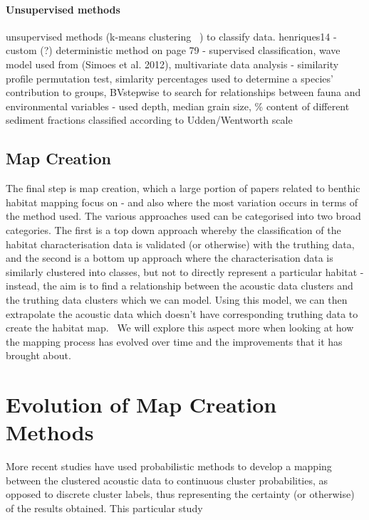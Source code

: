 \documentclass[12pt]{article}
\begin{document}
\begin{multicols}{2}
            \paragraph{Unsupervised methods}
            unsupervised methods (k-means clustering ~\citep{henriques14}) to classify data.
            henriques14 - custom (?) deterministic method on page 79 - supervised classification, wave model used from (Simoes et al. 2012), multivariate data analysis - similarity profile permutation test, simlarity percentages used to determine a species' contribution to groups, BVstepwise to search for relationships between fauna and environmental variables - used depth, median grain size, \% content of different sediment fractions classified according to Udden/Wentworth scale~\citep{henriques14}

            \subsection{Map Creation}
            The final step is map creation, which a large portion of papers related to benthic habitat mapping focus on - and also where the most variation occurs in terms of the method used. The various approaches used can be categorised into two broad categories. The first is a top down approach whereby the classification of the habitat characterisation data is validated (or otherwise) with the truthing data, and the second is a bottom up approach where the characterisation data is similarly clustered into classes, but not to directly represent a particular habitat - instead, the aim is to find a relationship between the acoustic data clusters and the truthing data clusters which we can model. Using this model, we can then extrapolate the acoustic data which doesn't have corresponding truthing data to create the habitat map.~\citep{ahsan11} We will explore this aspect more when looking at how the mapping process has evolved over time and the improvements that it has brought about.

            \section{Evolution of Map Creation Methods}

            More recent studies have used probabilistic methods to develop a mapping between the clustered acoustic data to continuous cluster probabilities, as opposed to discrete cluster labels, thus representing the certainty (or otherwise) of the results obtained. This particular study ~\citep{bender12}


\end{multicols}
\end{document}
